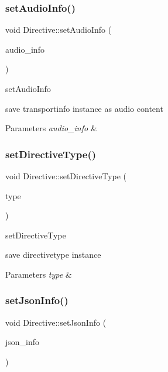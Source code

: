 \subsubsection{\texorpdfstring{set\+Audio\+Info()}{setAudioInfo()}}
{\footnotesize\ttfamily void Directive\+::set\+Audio\+Info (\begin{DoxyParamCaption}\item[{\hyperlink{classAlexaEvent_1_1TransportInfo}{Alexa\+Event\+::\+Transport\+Info} $\ast$}]{audio\+\_\+info }\end{DoxyParamCaption})}



set\+Audio\+Info 

save transportinfo instance as audio content 
\begin{DoxyParams}{Parameters}
{\em audio\+\_\+info} & \\
\hline
\end{DoxyParams}
\mbox{\label{classdirective_1_1Directive_a9552b16869e2f677b7d4de6f86e74380}} 
\subsubsection{\texorpdfstring{set\+Directive\+Type()}{setDirectiveType()}}
{\footnotesize\ttfamily void Directive\+::set\+Directive\+Type (\begin{DoxyParamCaption}\item[{\hyperlink{classdirective_1_1DirectiveType}{Directive\+Type} $\ast$}]{type }\end{DoxyParamCaption})}



set\+Directive\+Type 

save directivetype instance 
\begin{DoxyParams}{Parameters}
{\em type} & \\
\hline
\end{DoxyParams}
\mbox{\label{classdirective_1_1Directive_a792b74f87e9b15b12c03d1cf3716e630}} 
\subsubsection{\texorpdfstring{set\+Json\+Info()}{setJsonInfo()}}
{\footnotesize\ttfamily void Directive\+::set\+Json\+Info (\begin{DoxyParamCaption}\item[{\hyperlink{classAlexaEvent_1_1TransportInfo}{Alexa\+Event\+::\+Transport\+Info} $\ast$}]{json\+\_\+info }\end{DoxyParamCaption})}



